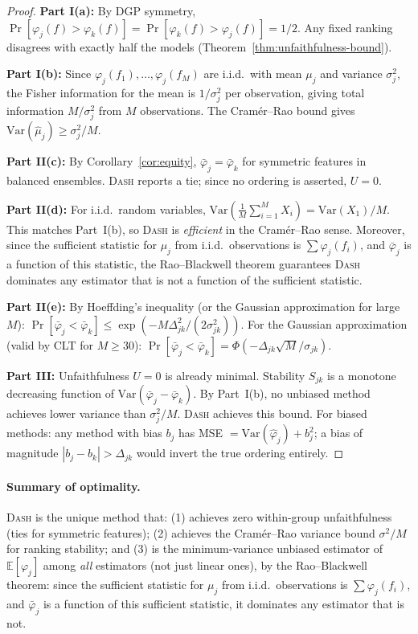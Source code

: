 \documentclass{article}
\newcommand{\E}{\mathbb{E}}
\newcommand{\Var}{\mathrm{Var}}
\newcommand{\DASH}{\textsc{Dash}}
\begin{document}
\begin{proof}
\textbf{Part I(a):} By DGP symmetry, $\Pr[\varphi_j(f) > \varphi_k(f)] = \Pr[\varphi_k(f) > \varphi_j(f)] = 1/2$. Any fixed ranking disagrees with exactly half the models (Theorem~\ref{thm:unfaithfulness-bound}).

\textbf{Part I(b):} Since $\varphi_j(f_1), \ldots, \varphi_j(f_M)$ are i.i.d.\ with mean $\mu_j$ and variance $\sigma_j^2$, the Fisher information for the mean is $1/\sigma_j^2$ per observation, giving total information $M/\sigma_j^2$ from $M$ observations. The Cram\'er--Rao bound gives $\Var(\hat\mu_j) \geq \sigma_j^2/M$.

\textbf{Part II(c):} By Corollary~\ref{cor:equity}, $\bar\varphi_j = \bar\varphi_k$ for symmetric features in balanced ensembles. \DASH{} reports a tie; since no ordering is asserted, $U = 0$.

\textbf{Part II(d):} For i.i.d.\ random variables, $\Var(\frac{1}{M}\sum_{i=1}^M X_i) = \Var(X_1)/M$. This matches Part~I(b), so \DASH{} is \emph{efficient} in the Cram\'er--Rao sense. Moreover, since the sufficient statistic for $\mu_j$ from i.i.d.\ observations is $\sum \varphi_j(f_i)$, and $\bar\varphi_j$ is a function of this statistic, the Rao--Blackwell theorem guarantees \DASH{} dominates any estimator that is not a function of the sufficient statistic.

\textbf{Part II(e):} By Hoeffding's inequality (or the Gaussian approximation for large $M$): $\Pr[\bar\varphi_j < \bar\varphi_k] \leq \exp(-M\Delta_{jk}^2/(2\sigma_{jk}^2))$. For the Gaussian approximation (valid by CLT for $M \geq 30$): $\Pr[\bar\varphi_j < \bar\varphi_k] = \Phi(-\Delta_{jk}\sqrt{M}/\sigma_{jk})$.

\textbf{Part III:} Unfaithfulness $U = 0$ is already minimal. Stability $S_{jk}$ is a monotone decreasing function of $\Var(\bar\varphi_j - \bar\varphi_k)$. By Part~I(b), no unbiased method achieves lower variance than $\sigma_j^2/M$. \DASH{} achieves this bound. For biased methods: any method with bias $b_j$ has MSE $= \Var(\hat\varphi_j) + b_j^2$; a bias of magnitude $|b_j - b_k| > \Delta_{jk}$ would invert the true ordering entirely.
\end{proof}

\paragraph{Summary of optimality.}
\DASH{} is the unique method that: (1) achieves zero within-group unfaithfulness (ties for symmetric features); (2) achieves the Cram\'er--Rao variance bound $\sigma^2/M$ for ranking stability; and (3) is the minimum-variance unbiased estimator of $\E[\varphi_j]$ among \emph{all} estimators (not just linear ones), by the Rao--Blackwell theorem: since the sufficient statistic for $\mu_j$ from i.i.d.\ observations is $\sum \varphi_j(f_i)$, and $\bar\varphi_j$ is a function of this sufficient statistic, it dominates any estimator that is not.
\end{document}
